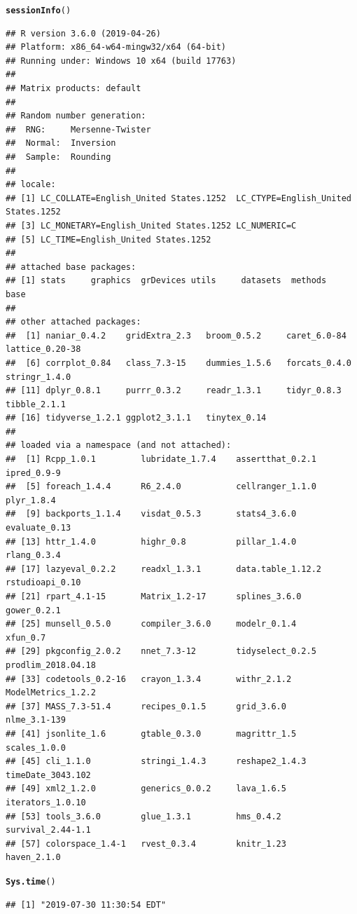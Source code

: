\documentclass{article}\usepackage[]{graphicx}\usepackage[]{color}
\makeatletter
\newcommand{\hlstd}[1]{\textcolor[rgb]{0.345,0.345,0.345}{#1}}%
\newcommand{\hlkwd}[1]{\textcolor[rgb]{0.737,0.353,0.396}{\textbf{#1}}}%
\newenvironment{kframe}{%
 \def\at@end@of@kframe{}%
 \ifinner\ifhmode%
  \def\at@end@of@kframe{\end{minipage}}%
  \begin{minipage}{\columnwidth}%
 \fi\fi%
 \def\FrameCommand##1{\hskip\@totalleftmargin \hskip-\fboxsep
 \colorbox{shadecolor}{##1}\hskip-\fboxsep
     \hskip-\linewidth \hskip-\@totalleftmargin \hskip\columnwidth}%
 \MakeFramed {\advance\hsize-\width
   \@totalleftmargin\z@ \linewidth\hsize
   \@setminipage}}%
 {\par\unskip\endMakeFramed%
 \at@end@of@kframe}
\newenvironment{knitrout}{}{} %
\makeatother
\begin{document}
\begin{knitrout}
\color{fgcolor}\begin{kframe}
\begin{alltt}
\hlkwd{sessionInfo}\hlstd{()}
\end{alltt}
\begin{verbatim}
## R version 3.6.0 (2019-04-26)
## Platform: x86_64-w64-mingw32/x64 (64-bit)
## Running under: Windows 10 x64 (build 17763)
## 
## Matrix products: default
## 
## Random number generation:
##  RNG:     Mersenne-Twister 
##  Normal:  Inversion 
##  Sample:  Rounding 
##  
## locale:
## [1] LC_COLLATE=English_United States.1252  LC_CTYPE=English_United States.1252   
## [3] LC_MONETARY=English_United States.1252 LC_NUMERIC=C                          
## [5] LC_TIME=English_United States.1252    
## 
## attached base packages:
## [1] stats     graphics  grDevices utils     datasets  methods   base     
## 
## other attached packages:
##  [1] naniar_0.4.2    gridExtra_2.3   broom_0.5.2     caret_6.0-84    lattice_0.20-38
##  [6] corrplot_0.84   class_7.3-15    dummies_1.5.6   forcats_0.4.0   stringr_1.4.0  
## [11] dplyr_0.8.1     purrr_0.3.2     readr_1.3.1     tidyr_0.8.3     tibble_2.1.1   
## [16] tidyverse_1.2.1 ggplot2_3.1.1   tinytex_0.14   
## 
## loaded via a namespace (and not attached):
##  [1] Rcpp_1.0.1         lubridate_1.7.4    assertthat_0.2.1   ipred_0.9-9       
##  [5] foreach_1.4.4      R6_2.4.0           cellranger_1.1.0   plyr_1.8.4        
##  [9] backports_1.1.4    visdat_0.5.3       stats4_3.6.0       evaluate_0.13     
## [13] httr_1.4.0         highr_0.8          pillar_1.4.0       rlang_0.3.4       
## [17] lazyeval_0.2.2     readxl_1.3.1       data.table_1.12.2  rstudioapi_0.10   
## [21] rpart_4.1-15       Matrix_1.2-17      splines_3.6.0      gower_0.2.1       
## [25] munsell_0.5.0      compiler_3.6.0     modelr_0.1.4       xfun_0.7          
## [29] pkgconfig_2.0.2    nnet_7.3-12        tidyselect_0.2.5   prodlim_2018.04.18
## [33] codetools_0.2-16   crayon_1.3.4       withr_2.1.2        ModelMetrics_1.2.2
## [37] MASS_7.3-51.4      recipes_0.1.5      grid_3.6.0         nlme_3.1-139      
## [41] jsonlite_1.6       gtable_0.3.0       magrittr_1.5       scales_1.0.0      
## [45] cli_1.1.0          stringi_1.4.3      reshape2_1.4.3     timeDate_3043.102 
## [49] xml2_1.2.0         generics_0.0.2     lava_1.6.5         iterators_1.0.10  
## [53] tools_3.6.0        glue_1.3.1         hms_0.4.2          survival_2.44-1.1 
## [57] colorspace_1.4-1   rvest_0.3.4        knitr_1.23         haven_2.1.0
\end{verbatim}
\begin{alltt}
\hlkwd{Sys.time}\hlstd{()}
\end{alltt}
\begin{verbatim}
## [1] "2019-07-30 11:30:54 EDT"
\end{verbatim}
\end{kframe}
\end{knitrout}
\end{document}
